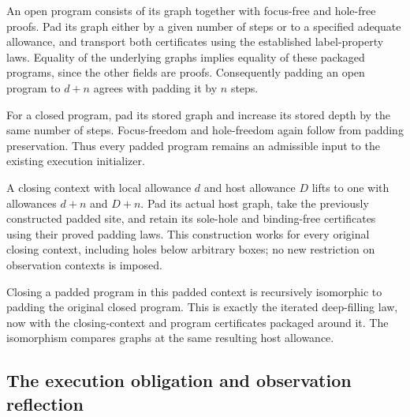An open program consists of its graph together with focus-free and hole-free
proofs. Pad its graph either by a given number of steps or to a specified
adequate allowance, and transport both certificates using the established
label-property laws. Equality of the underlying graphs implies equality of
these packaged programs, since the other fields are proofs. Consequently
padding an open program to $d+n$ agrees with padding it by $n$ steps.






For a closed program, pad its stored graph and increase its stored depth by
the same number of steps. Focus-freedom and hole-freedom again follow from
padding preservation. Thus every padded program remains an admissible input
to the existing execution initializer.



A closing context with local allowance $d$ and host allowance $D$ lifts to
one with allowances $d+n$ and $D+n$. Pad its actual host graph, take the
previously constructed padded site, and retain its sole-hole and binding-free
certificates using their proved padding laws. This construction works for
every original closing context, including holes below arbitrary boxes; no
new restriction on observation contexts is imposed.

Closing a padded program in this padded context is recursively isomorphic to
padding the original closed program. This is exactly the iterated deep-filling
law, now with the closing-context and program certificates packaged around
it. The isomorphism compares graphs at the same resulting host allowance.




\subsection{The execution obligation and observation reflection}

